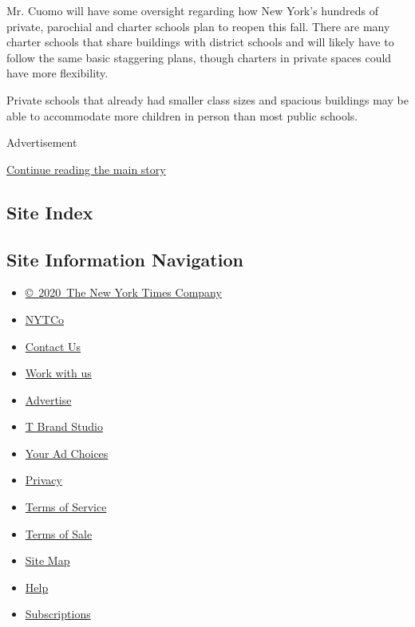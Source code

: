 Mr. Cuomo will have some oversight regarding how New York's hundreds of
private, parochial and charter schools plan to reopen this fall. There
are many charter schools that share buildings with district schools and
will likely have to follow the same basic staggering plans, though
charters in private spaces could have more flexibility.

Private schools that already had smaller class sizes and spacious
buildings may be able to accommodate more children in person than most
public schools.

Advertisement

\protect\hyperlink{after-bottom}{Continue reading the main story}

\hypertarget{site-index}{%
\subsection{Site Index}\label{site-index}}

\hypertarget{site-information-navigation}{%
\subsection{Site Information
Navigation}\label{site-information-navigation}}

\begin{itemize}
\tightlist
\item
  \href{https://help.nytimes.com/hc/en-us/articles/115014792127-Copyright-notice}{©~2020~The
  New York Times Company}
\end{itemize}

\begin{itemize}
\tightlist
\item
  \href{https://www.nytco.com/}{NYTCo}
\item
  \href{https://help.nytimes.com/hc/en-us/articles/115015385887-Contact-Us}{Contact
  Us}
\item
  \href{https://www.nytco.com/careers/}{Work with us}
\item
  \href{https://nytmediakit.com/}{Advertise}
\item
  \href{http://www.tbrandstudio.com/}{T Brand Studio}
\item
  \href{https://www.nytimes.com/privacy/cookie-policy\#how-do-i-manage-trackers}{Your
  Ad Choices}
\item
  \href{https://www.nytimes.com/privacy}{Privacy}
\item
  \href{https://help.nytimes.com/hc/en-us/articles/115014893428-Terms-of-service}{Terms
  of Service}
\item
  \href{https://help.nytimes.com/hc/en-us/articles/115014893968-Terms-of-sale}{Terms
  of Sale}
\item
  \href{https://spiderbites.nytimes.com}{Site Map}
\item
  \href{https://help.nytimes.com/hc/en-us}{Help}
\item
  \href{https://www.nytimes.com/subscription?campaignId=37WXW}{Subscriptions}
\end{itemize}

